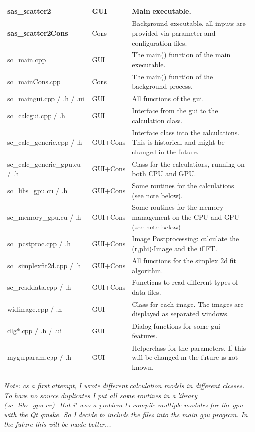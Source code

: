 \documentclass[11pt]{article} %
\begin{document}
\begin{longtable}{|L{3.6cm}|C{2cm}L{11.5cm}|}
\hline
{\bf sas\_scatter2} & GUI & Main executable. \\ \hline
{\bf sas\_scatter2Cons} & Cons & Background executable, all inputs are provided via parameter and configuration files. \\ \hline
sc\_main.cpp & GUI & The main() function of the main executable. \\ \hline
sc\_mainCons.cpp & Cons & The main() function of the background process. \\ \hline
sc\_maingui.cpp / .h / .ui & GUI & All functions of the gui. \\ \hline
sc\_calcgui.cpp / .h & GUI & Interface from the gui to the calculation class. \\ \hline
sc\_calc\_generic.cpp / .h & GUI+Cons & Interface class into the calculations. This is historical and might be changed in the future. \\ \hline
sc\_calc\_generic\_gpu.cu / .h & GUI+Cons & Class for the calculations, running on both CPU and GPU. \\ \hline
sc\_libs\_gpu.cu / .h & GUI+Cons & Some routines for the calculations (see note below). \\ \hline
sc\_memory\_gpu.cu / .h & GUI+Cons & Some routines for the memory management on the CPU and GPU (see note below). \\ \hline
sc\_postproc.cpp / .h & GUI+Cons & Image Postprocessing: calculate the (r,phi)-Image and the iFFT. \\ \hline
sc\_simplexfit2d.cpp / .h & GUI+Cons & All functions for the simplex 2d fit algorithm. \\ \hline
sc\_readdata.cpp / .h & GUI+Cons & Functions to read different types of data files. \\ \hline
widimage.cpp / .h & GUI & Class for each image. The images are displayed as separated windows. \\ \hline
dlg*.cpp / .h / .ui & GUI & Dialog functions for some gui features. \\ \hline
myguiparam.cpp / .h & GUI & Helperclass for the parameters. If this will be changed in the future is not known. \\ \hline
\end{longtable}
{\it Note: as a first attempt, I wrote different calculation models in different classes. To have no source duplicates I put all same routines in a library (sc\_libs\_gpu.cu). But it was a problem to compile multiple modules for the gpu with the Qt qmake. So I decide to include the files into the main gpu program. In the future this will be made better...}
\end{document}
